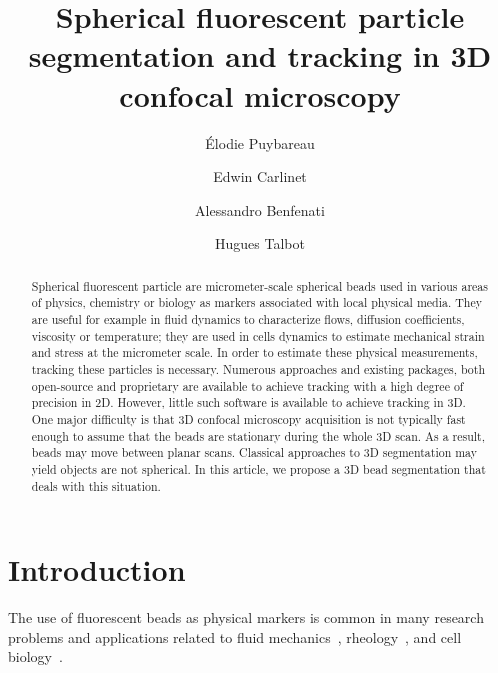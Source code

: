 \documentclass{llncs}
\begin{document}
\title{Spherical fluorescent particle segmentation and tracking in 3D confocal microscopy}

\author{\'{E}lodie Puybareau \and Edwin Carlinet \and Alessandro Benfenati \and Hugues Talbot}


\maketitle

\begin{abstract}
Spherical fluorescent particle are micrometer-scale spherical beads used in various areas of physics, chemistry or biology as markers associated
with local physical media. They are useful for example in fluid dynamics to characterize flows, diffusion coefficients, viscosity or temperature; they 
are used in cells dynamics to estimate mechanical strain and stress at the micrometer scale. In order to estimate these physical measurements, tracking these
particles is necessary. Numerous approaches and existing packages, both open-source and proprietary are available to achieve tracking with a high degree of precision in 2D. However,
little such software is available to achieve tracking in 3D. One major difficulty is that 3D confocal microscopy acquisition is not typically fast enough to assume
that the beads are stationary during the whole 3D scan. As a result, beads may move between planar scans. Classical approaches to 3D segmentation may yield objects are not spherical.
In this article, we propose a 3D bead segmentation that deals with this situation. 

\end{abstract}

\section{Introduction}\label{sec:Introduction}
The use of fluorescent beads as physical markers is common in many research problems and applications related to fluid mechanics~\cite{park2005temperature}, rheology~\cite{PGDG:Polymers:1979}, and cell biology~\cite{wang1993mechanotransduction}.
\end{document}
